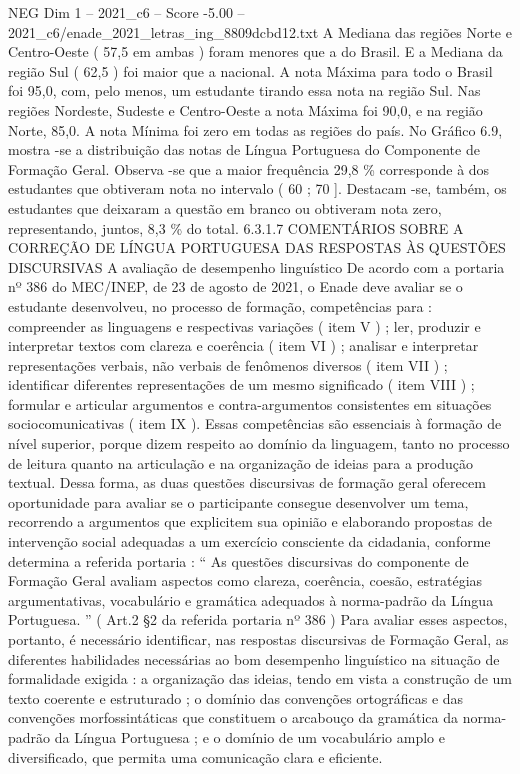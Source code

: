 \begin{textsample}{NEG Dim 1 – 2021\_c6 – Score -5.00 – 2021\_c6/enade\_2021\_letras\_ing\_8809dcbd12.txt}
A Mediana das regiões Norte e Centro-Oeste ( 57,5 em ambas ) foram menores que a do Brasil.
E a Mediana da região Sul ( 62,5 ) foi maior que a nacional.
A nota Máxima para todo o Brasil foi 95,0, com, pelo menos, um estudante tirando essa nota na região Sul.
Nas regiões Nordeste, Sudeste e Centro-Oeste a nota Máxima foi 90,0, e na região Norte, 85,0.
A nota Mínima foi zero em todas as regiões do país.
No Gráfico 6.9, mostra -se a distribuição das notas de Língua Portuguesa do Componente de Formação Geral.
Observa -se que a maior frequência 29,8 \% corresponde à dos estudantes que obtiveram nota no intervalo ( 60 ; 70 ].
Destacam -se, também, os estudantes que deixaram a questão em branco ou obtiveram nota zero, representando, juntos, 8,3 \% do total. 6.3.1.7 COMENTÁRIOS SOBRE A CORREÇÃO DE LÍNGUA PORTUGUESA DAS RESPOSTAS ÀS QUESTÕES DISCURSIVAS A avaliação de desempenho linguístico De acordo com a portaria nº 386 do MEC/INEP, de 23 de agosto de 2021, o Enade deve avaliar se o estudante desenvolveu, no processo de formação, competências para : compreender as linguagens e respectivas variações ( item V ) ; ler, produzir e interpretar textos com clareza e coerência ( item VI ) ; analisar e interpretar representações verbais, não verbais de fenômenos diversos ( item VII ) ; identificar diferentes representações de um mesmo significado ( item VIII ) ; formular e articular argumentos e contra-argumentos consistentes em situações sociocomunicativas ( item IX ).
Essas competências são essenciais à formação de nível superior, porque dizem respeito ao domínio da linguagem, tanto no processo de leitura quanto na articulação e na organização de ideias para a produção textual.
Dessa forma, as duas questões discursivas de formação geral oferecem oportunidade para avaliar se o participante consegue desenvolver um tema, recorrendo a argumentos que explicitem sua opinião e elaborando propostas de intervenção social adequadas a um exercício consciente da cidadania, conforme determina a referida portaria : “ As questões discursivas do componente de Formação Geral avaliam aspectos como clareza, coerência, coesão, estratégias argumentativas, vocabulário e gramática adequados à norma-padrão da Língua Portuguesa. ” ( Art.2 §2 da referida portaria nº 386 ) Para avaliar esses aspectos, portanto, é necessário identificar, nas respostas discursivas de Formação Geral, as diferentes habilidades necessárias ao bom desempenho linguístico na situação de formalidade exigida : a organização das ideias, tendo em vista a construção de um texto coerente e estruturado ; o domínio das convenções ortográficas e das convenções morfossintáticas que constituem o arcabouço da gramática da norma-padrão da Língua Portuguesa ; e o domínio de um vocabulário amplo e diversificado, que permita uma comunicação clara e eficiente.

\end{textsample}
